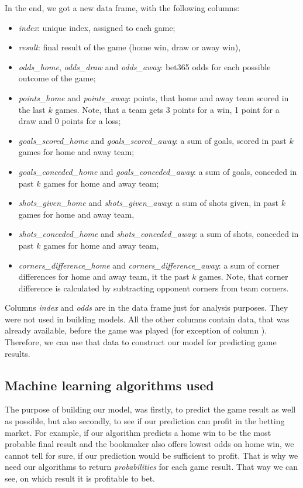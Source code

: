\documentclass[conference]{IEEEtran}
\begin{document}
In the end, we got a new data frame, with the following columns:
\begin{itemize}
    \item \textit{index}: unique index, assigned to each game;
    \item \textit{result}: final result of the game (home win, draw or away win),
    \item \textit{odds\_home}, \textit{odds\_draw} and \textit{odds\_away}: bet365 odds for each possible outcome of the game;
    \item \textit{points\_home} and \textit{points\_away}: points, that home and away team scored in the last $k$ games. Note,
    that a team gets 3 points for a win, 1 point for a draw and 0 points for a loss;
    \item \textit{goals\_scored\_home} and \textit{goals\_scored\_away}: a sum of goals, scored in past $k$ games for home and away
    team;
    \item \textit{goals\_conceded\_home} and \textit{goals\_conceded\_away}: a sum of goals, conceded in past $k$ games for home 
    and away team;
    \item \textit{shots\_given\_home} and \textit{shots\_given\_away}: a sum of shots given, in past $k$ games for home 
    and away team,
    \item \textit{shots\_conceded\_home} and \textit{shots\_conceded\_away}: a sum of shots, conceded in past $k$ games for home 
    and away team,
    \item \textit{corners\_difference\_home} and \textit{corners\_difference\_away}: a sum of corner differences for home and away 
    team, it the past $k$ games. Note, that corner difference is calculated by subtracting opponent corners from team corners. 
\end{itemize}

Columns \textit{index} and \textit{odds} are in the data frame just for analysis purposes. They were not used in building models.
All the other columns contain data, that was already available, before the game was played (for exception of column ). Therefore, we can use that data to construct our model for predicting game results.

\subsection{Machine learning algorithms used}

The purpose of building our model, was firstly, to predict the game result as well as possible, but also secondly, to see if our
prediction can profit in the betting market. For example, if our algorithm predicts a home win to be the most probable final 
result and the bookmaker also offers lowest odds on home win, we cannot tell for sure, if our prediction would be sufficient to
profit. That is why we need our algorithms to return \textit{probabilities} for each game result. That way we can see, on which
result it is profitable to bet.
\end{document}
